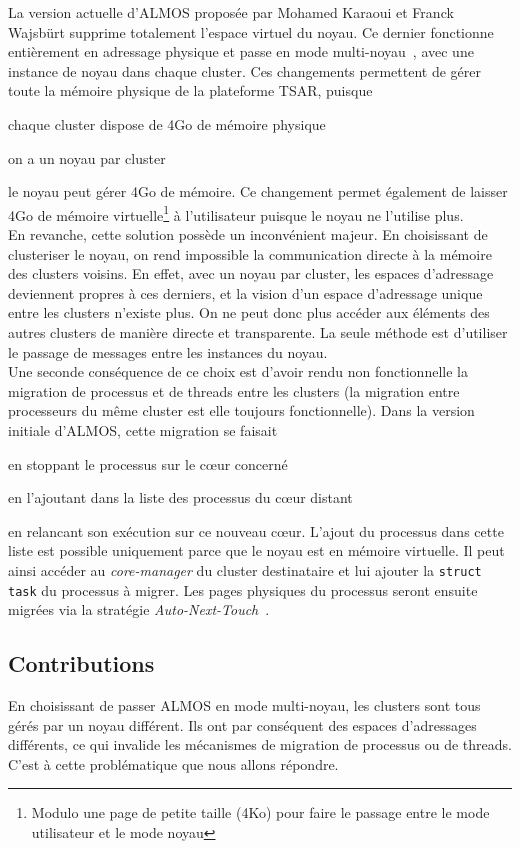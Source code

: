       La version actuelle d'ALMOS proposée par Mohamed Karaoui et Franck
      Wajsbürt supprime totalement l'espace virtuel du noyau. Ce dernier
      fonctionne entièrement en adressage physique et passe en mode
      multi-noyau~\citep{baumann2009multikernel}, avec une instance de noyau
      dans chaque cluster. Ces changements permettent de gérer toute la mémoire
      physique de la plateforme TSAR, puisque \benumline \item chaque cluster
      dispose de 4Go de mémoire physique \item on a un noyau par cluster \item
      le noyau peut gérer 4Go de mémoire\eenumline. Ce changement permet
      également de laisser 4Go de mémoire virtuelle\footnote{Modulo une page de
        petite taille (4Ko) pour faire le passage entre le mode utilisateur et
        le mode noyau} à l'utilisateur puisque le noyau ne l'utilise plus.\\

      En revanche, cette solution possède un inconvénient majeur. En choisissant
      de clusteriser le noyau, on rend impossible la communication directe à la
      mémoire des clusters voisins. En effet, avec un noyau par cluster, les
      espaces d'adressage deviennent propres à ces derniers, et la vision d'un
      espace d'adressage unique entre les clusters n'existe plus. On ne peut
      donc plus accéder aux éléments des autres clusters de manière directe et
      transparente. La seule méthode est d'utiliser le passage de messages entre
      les instances du noyau.\\

      Une seconde conséquence de ce choix est d'avoir rendu non fonctionnelle la
      migration de processus et de threads entre les clusters (la migration
      entre processeurs du même cluster est elle toujours fonctionnelle). Dans
      la version initiale d'ALMOS, cette migration se faisait\benumline \item en
      stoppant le processus sur le c\oe ur concerné \item en l'ajoutant dans la
      liste des processus du c\oe ur distant \item en relancant son exécution
      sur ce nouveau c\oe ur\eenumline. L'ajout du processus dans cette liste
      est possible uniquement parce que le noyau est en mémoire virtuelle. Il
      peut ainsi accéder au \textit{core-manager} du cluster destinataire et lui
      ajouter la \texttt{struct task} du processus à migrer. Les pages physiques
      du processus seront ensuite migrées via la stratégie
      \textit{Auto-Next-Touch}~\citep{almaless2014universite}.


    \subsection{Contributions}

      En choisissant de passer ALMOS en mode multi-noyau, les clusters sont tous
      gérés par un noyau différent. Ils ont par conséquent des espaces
      d'adressages différents, ce qui invalide les mécanismes de migration de
      processus ou de threads. C'est à cette problématique que nous allons
      répondre.
